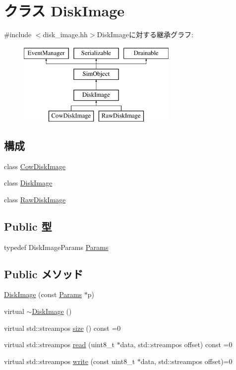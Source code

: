 \hypertarget{classDiskImage}{
\section{クラス DiskImage}
\label{classDiskImage}
}


{\ttfamily \#include $<$disk\_\-image.hh$>$}DiskImageに対する継承グラフ:\begin{figure}[H]
\begin{center}
\leavevmode
\includegraphics[height=4cm]{classDiskImage}
\end{center}
\end{figure}
\subsection*{構成}
\begin{DoxyCompactItemize}
\item 
class \hyperlink{classDiskImage_1_1CowDiskImage}{CowDiskImage}
\item 
class \hyperlink{classDiskImage_1_1DiskImage}{DiskImage}
\item 
class \hyperlink{classDiskImage_1_1RawDiskImage}{RawDiskImage}
\end{DoxyCompactItemize}
\subsection*{Public 型}
\begin{DoxyCompactItemize}
\item 
typedef DiskImageParams \hyperlink{classDiskImage_a7fcdce57df9801d7eebcb65f9ad2e0c0}{Params}
\end{DoxyCompactItemize}
\subsection*{Public メソッド}
\begin{DoxyCompactItemize}
\item 
\hyperlink{classDiskImage_a179891f520c932a7cf5c88dfc25c0b3b}{DiskImage} (const \hyperlink{classDiskImage_a7fcdce57df9801d7eebcb65f9ad2e0c0}{Params} $\ast$p)
\item 
virtual \hyperlink{classDiskImage_a683bb9b788e4d03b2d080fddc83665b5}{$\sim$DiskImage} ()
\item 
virtual std::streampos \hyperlink{classDiskImage_a0e772d58951a6696fce770bd4c390e9f}{size} () const =0
\item 
virtual std::streampos \hyperlink{classDiskImage_afcf02c1fffcb16ed79ac38bb87fb572c}{read} (uint8\_\-t $\ast$data, std::streampos offset) const =0
\item 
virtual std::streampos \hyperlink{classDiskImage_a42c90a80133a988d65ab33cc4d31d168}{write} (const uint8\_\-t $\ast$data, std::streampos offset)=0
\end{DoxyCompactItemize}
